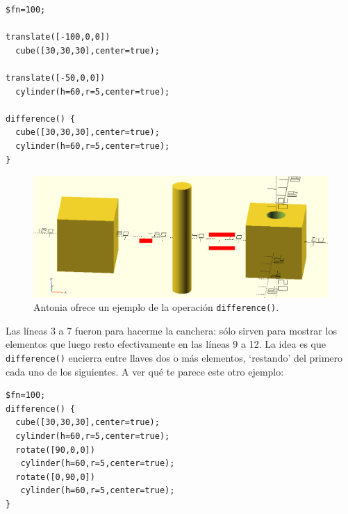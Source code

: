     \begin{lstlisting}
$fn=100;
      
translate([-100,0,0])
  cube([30,30,30],center=true);  

translate([-50,0,0])
  cylinder(h=60,r=5,center=true);  

difference() {
  cube([30,30,30],center=true);
  cylinder(h=60,r=5,center=true);
}
    \end{lstlisting}%

    \begin{figure}[ht]
      \centering
      \includegraphics[width=.75\textwidth]{imagenes/diferencia-signos}      
      \caption{Antonia ofrece un ejemplo de la operación
        \lstinline!difference()!.}
      \label{fig:diferencia-signos}
    \end{figure}

  
    \guillemotright Las líneas 3 a 7 fueron para hacerme la canchera:
    sólo sirven para mostrar los elementos que luego resto
    efectivamente en las líneas 9 a 12. La idea es que
    \lstinline!difference()! encierra entre llaves dos o más
    elementos, `restando' del primero cada uno de los siguientes. A
    ver qué te parece este otro ejemplo:

    \begin{lstlisting}
$fn=100;
difference() {
  cube([30,30,30],center=true);
  cylinder(h=60,r=5,center=true);
  rotate([90,0,0])
   cylinder(h=60,r=5,center=true);
  rotate([0,90,0])
   cylinder(h=60,r=5,center=true);
}
    \end{lstlisting}%


